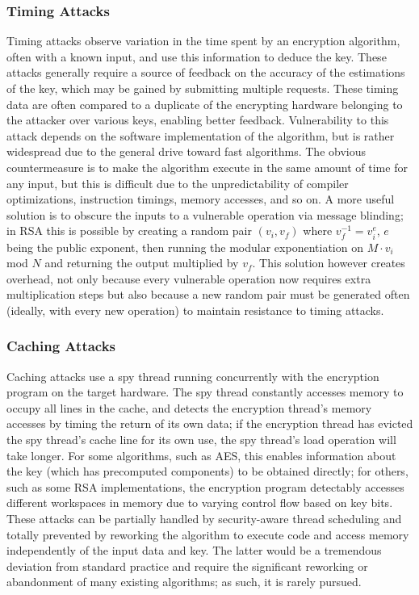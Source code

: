 \documentclass[times, 10pt,twocolumn]{article}
\begin{document}
\subsubsection{Timing Attacks}
Timing attacks observe variation in the time spent by an encryption algorithm, often with a known input, and use this information to deduce the key.  These attacks generally require a source of feedback on the accuracy of the estimations of the key, which may be gained by submitting multiple requests. These timing data are often compared to a duplicate of the encrypting hardware belonging to the attacker over various keys, enabling better feedback.  Vulnerability to this attack depends on the software implementation of the algorithm, but is rather widespread due to the general drive toward fast algorithms.  The obvious countermeasure is to make the algorithm execute in the same amount of time for any input, but this is difficult due to the unpredictability of compiler optimizations, instruction timings, memory accesses, and so on.  A more useful solution is to obscure the inputs to a vulnerable operation via message blinding\cite{mmthesis}; in RSA this is possible by creating a random pair $(v_{i},v_{f})$ where $v_{f}^{-1}=v_{i}^e$, $e$ being the public exponent, then running the modular exponentiation on $M\cdot v_{i}$ mod $N$ and returning the output multiplied by $v_{f}$\cite{Kocher96timingattacks}. This solution however creates overhead, not only because every vulnerable operation now requires extra multiplication steps but also because a new random pair must be generated often (ideally, with every new operation) to maintain resistance to timing attacks.

\subsubsection{Caching Attacks}
Caching attacks use a spy thread running concurrently with the encryption program on the target hardware.  The spy thread constantly accesses memory to occupy all lines in the cache, and detects the encryption thread's memory accesses by timing the return of its own data; if the encryption thread has evicted the spy thread's cache line for its own use, the spy thread's load operation will take longer.  For some algorithms, such as AES\cite{2004-bernstein-cachetiming}, this enables information about the key (which has precomputed components) to be obtained directly; for others, such as some RSA implementations\cite{Percival05cachemissing}, the encryption program detectably accesses different workspaces in memory due to varying control flow based on key bits.  These attacks can be partially handled by security-aware thread scheduling and totally prevented by reworking the algorithm to execute code and access memory independently of the input data and key.  The latter would be a tremendous deviation from standard practice and require the significant reworking or abandonment of many existing algorithms\cite{Percival05cachemissing}; as such, it is rarely pursued.
\end{document}
